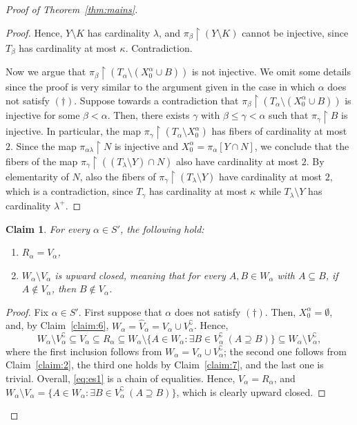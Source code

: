 \documentclass[]{amsart}
\newtheorem{claim}{Claim}[theorem]
\theoremstyle{definition}
\theoremstyle{remark}
\begin{document}
\begin{proof}[Proof of Theorem~\ref{thm:mains}]
\begin{proof}
Hence, $Y \setminus K$ has cardinality $\lambda$, and $\pi_\beta \upharpoonright (Y \setminus K)$ cannot be injective, since $T_\beta$ has cardinality at most $\kappa$. Contradiction.

Now we argue that $\pi_{\beta} \upharpoonright (T_\alpha \setminus (X^\alpha_0 \cup  B))$  is not injective. We omit some details since the proof is very similar to the argument given in the case in which $\alpha$ does not satisfy $(\dagger)$. Suppose towards a contradiction that $\pi_{\beta} \upharpoonright (T_\alpha \setminus (X^\alpha_0 \cup  B))$ is injective for some $\beta < \alpha$. Then, there exists $\gamma$ with $\beta \le \gamma < \alpha$ such that $\pi_\gamma \upharpoonright B$ is injective. In particular, the map $\pi_\gamma \upharpoonright (T_\alpha \setminus X^\alpha_0)$ has fibers of cardinality at most $2$. Since the map $\pi_{\alpha \lambda} \upharpoonright N$ is injective and $X^\alpha_0 = \pi_\alpha[Y \cap N]$, we conclude that the fibers of the map $\pi_\gamma \upharpoonright ((T_\lambda \setminus Y) \cap N)$ also have cardinality at most $2$. By elementarity of $N$, also the fibers of $\pi_\gamma \upharpoonright (T_\lambda \setminus Y)$ have cardinality at most $2$, which is a contradiction, since $T_\gamma$ has cardinality at most $\kappa$ while $T_\lambda \setminus Y$ has cardinality $\lambda^+$.
\end{proof}


\begin{claim}\label{claim:8}
For every $\alpha \in S'$, the following hold:
\begin{enumerate}[label={\upshape (\arabic*)}]
\item $R_\alpha = V_\alpha$,
\item $W_\alpha \setminus V_\alpha$ is upward closed, meaning that for every $A, B \in W_\alpha$ with $A \subseteq B$, if $A \not\in V_\alpha$, then $B \not\in V_\alpha$.
\end{enumerate}
\end{claim}
\begin{proof}
Fix $\alpha \in S'$. First suppose that $\alpha$ does not satisfy $(\dagger)$. Then, $X^\alpha_0 = \emptyset$, and, by Claim~\ref{claim:6}, $W_\alpha = \hat{V}_\alpha =  V_\alpha \cup V_\alpha^\complement$. Hence,
\begin{equation}\label{eq:es1}
W_\alpha \setminus V_\alpha^\complement \subseteq V_\alpha \subseteq R_\alpha \subseteq W_\alpha \setminus \{A \in W_\alpha : \exists B \in V_\alpha^\complement \ (A \supseteq B)\} \subseteq W_\alpha \setminus V_\alpha^\complement,
\end{equation}
where the first inclusion follows from $W_\alpha = V_\alpha \cup V_\alpha^\complement$; the second one follows from Claim~\ref{claim:2}, the third one holds by Claim~\ref{claim:7}, and the last one is trivial. Overall, \eqref{eq:es1} is a chain of equalities. Hence, $V_\alpha = R_\alpha$, and $W_\alpha \setminus V_\alpha = \{A \in W_\alpha : \exists B \in V_\alpha^\complement \ (A \supseteq B)\}$, which  is clearly  upward closed.



\end{proof}
\end{proof}
\end{document}
